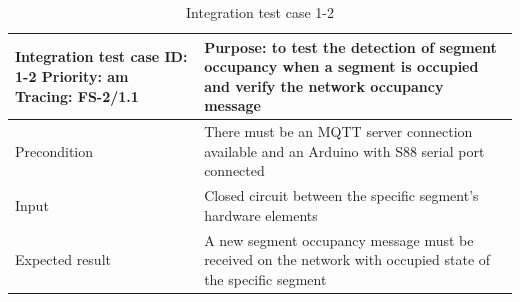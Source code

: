 \begin{table}[H]
	\caption{Integration test case 1-2}
	\label{table:TCase-FSI1-2}
	\begin{center}
		\renewcommand{\arraystretch}{1.8}
		\begin{tabu} 
			to 0.9 \textwidth
			{  X[0.4, c] X[c] }
			\toprule
			Integration test case ID: 1-2 \newline Priority: am \newline Tracing: FS-2/1.1 & Purpose: to test the detection of segment occupancy when a segment is occupied and verify the network occupancy message \\ \midrule
			Precondition                                                                   & There must be an MQTT server connection available and an Arduino with S88 serial port connected                         \\
			Input                                                                          & Closed circuit between the specific segment's hardware elements                                                         \\
			Expected result                                                                & A new segment occupancy message must be received on the network with occupied state of the specific segment             \\ \bottomrule
		\end{tabu}
	\end{center}
\end{table} 


